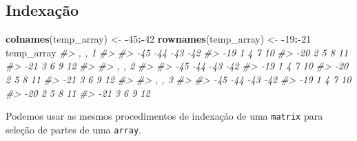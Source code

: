 \documentclass[]{book}
\newenvironment{Shaded}{\begin{snugshade}}{\end{snugshade}}
\newcommand{\KeywordTok}[1]{\textcolor[rgb]{0.13,0.29,0.53}{\textbf{#1}}}
\newcommand{\DecValTok}[1]{\textcolor[rgb]{0.00,0.00,0.81}{#1}}
\newcommand{\StringTok}[1]{\textcolor[rgb]{0.31,0.60,0.02}{#1}}
\newcommand{\CommentTok}[1]{\textcolor[rgb]{0.56,0.35,0.01}{\textit{#1}}}
\newcommand{\OperatorTok}[1]{\textcolor[rgb]{0.81,0.36,0.00}{\textbf{#1}}}
\newcommand{\NormalTok}[1]{#1}
\begin{document}
\subsection{Indexação}\label{indexacao}

\begin{Shaded}
\begin{Highlighting}[]
\KeywordTok{colnames}\NormalTok{(temp_array) <-}\StringTok{ }\OperatorTok{-}\DecValTok{45}\OperatorTok{:-}\DecValTok{42}
\KeywordTok{rownames}\NormalTok{(temp_array) <-}\StringTok{ }\OperatorTok{-}\DecValTok{19}\OperatorTok{:-}\DecValTok{21}
\NormalTok{temp_array}
\CommentTok{#> , , 1}
\CommentTok{#> }
\CommentTok{#>     -45 -44 -43 -42}
\CommentTok{#> -19   1   4   7  10}
\CommentTok{#> -20   2   5   8  11}
\CommentTok{#> -21   3   6   9  12}
\CommentTok{#> }
\CommentTok{#> , , 2}
\CommentTok{#> }
\CommentTok{#>     -45 -44 -43 -42}
\CommentTok{#> -19   1   4   7  10}
\CommentTok{#> -20   2   5   8  11}
\CommentTok{#> -21   3   6   9  12}
\CommentTok{#> }
\CommentTok{#> , , 3}
\CommentTok{#> }
\CommentTok{#>     -45 -44 -43 -42}
\CommentTok{#> -19   1   4   7  10}
\CommentTok{#> -20   2   5   8  11}
\CommentTok{#> -21   3   6   9  12}
\end{Highlighting}
\end{Shaded}

Podemos usar as mesmos procedimentos de indexação de uma \texttt{matrix}
para seleção de partes de uma \texttt{array}.
\end{document}
